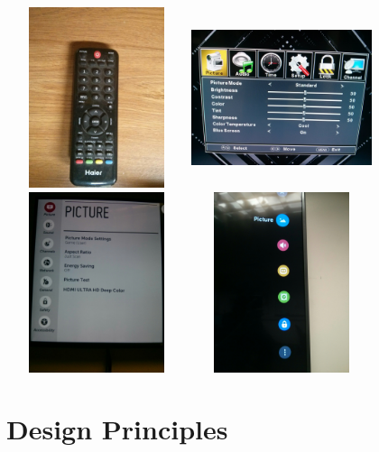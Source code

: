 \documentclass[a4paper, 11pt]{article}
\begin{document}
\includegraphics[width=200px,height=200px]{remoteold.jpg}
\includegraphics[width=200px,height=200px]{menuold.jpg}\\

\includegraphics[width=200px,height=200px]{menunew.jpg}
\includegraphics[width=200px,height=200px]{inputnew.jpg}

\section*{Design Principles}
\end{document}
